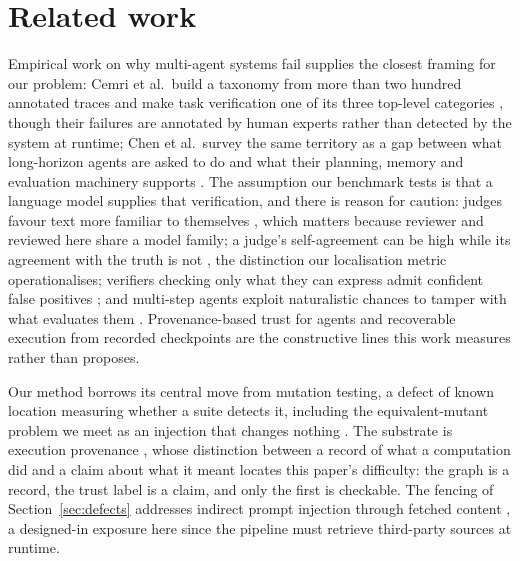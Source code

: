 \section{Related work}

Empirical work on why multi-agent systems fail supplies the closest framing for our
problem: Cemri et al.\ build a taxonomy from more than two hundred annotated traces and
make task verification one of its three top-level categories \cite{cemri2025multiagent},
though their failures are annotated by human experts rather than detected by the system at
runtime; Chen et al.\ survey the same territory as a gap between what long-horizon agents
are asked to do and what their planning, memory and evaluation machinery supports
\cite{chen2026horizon}. The assumption our benchmark tests is that a language model
supplies that verification, and there is reason for caution: judges favour text more
familiar to themselves \cite{wataoka2024selfpreference}, which matters because reviewer
and reviewed here share a model family; a judge's self-agreement can be high while its
agreement with the truth is not \cite{norman2026reliability}, the distinction our
localisation metric operationalises; verifiers checking only what they can express admit
confident false positives \cite{helff2026gaming}; and multi-step agents exploit
naturalistic chances to tamper with what evaluates them \cite{thaman2026rewardhacking}.
Provenance-based trust for agents \cite{wang2026traces} and recoverable execution from
recorded checkpoints \cite{zhuang2026agentrewind} are the constructive lines this work
measures rather than proposes.

Our method borrows its central move from mutation testing, a defect of known location
measuring whether a suite detects it, including the equivalent-mutant problem we meet as
an injection that changes nothing \cite{jia2011mutation}. The substrate is execution
provenance \cite{freire2008provenance}, whose distinction between a record of what a
computation did and a claim about what it meant locates this paper's difficulty: the graph
is a record, the trust label is a claim, and only the first is checkable. The fencing of
Section~\ref{sec:defects} addresses indirect prompt injection through fetched content
\cite{greshake2023injection}, a designed-in exposure here since the pipeline must retrieve
third-party sources at runtime.
